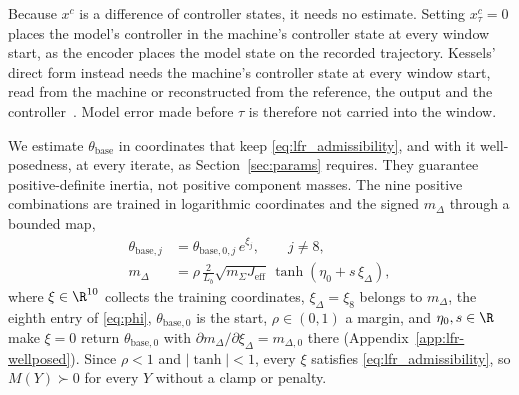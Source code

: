 Because $x^{c}$ is a difference of controller states, it needs no estimate.
Setting $x^{c}_\tau=0$ places the model's controller in the machine's
controller state at every window start, as the encoder places the model state
on the recorded trajectory.
Kessels' direct form instead needs the machine's controller state at every
window start, read from the machine or reconstructed from the reference, the
output and the controller~\cite[Remark~5.4]{kessels2025ai}.
Model error made before $\tau$ is therefore not carried into the window.

We estimate $\theta_{\mathrm{base}}$ in coordinates that keep
\eqref{eq:lfr_admissibility}, and with it well-posedness, at every iterate, as
Section~\ref{sec:params} requires.
They guarantee positive-definite inertia, not positive component masses.
The nine positive combinations are trained in logarithmic coordinates and the
signed $m_\Delta$ through a bounded map,
\begin{equation}
\begin{aligned}
 \theta_{\mathrm{base},j}&=\theta_{\mathrm{base},0,j}\,e^{\xi_j},
 \qquad j\neq8,\\
 m_\Delta&=\rho\,\frac{2}{L_b}\sqrt{m_\Sigma J_{\mathrm{eff}}}\,
   \tanh(\eta_0+s\,\xi_\Delta),
\end{aligned}
\label{eq:mdelta_map}
\end{equation}
where $\xi\in\R^{10}$ collects the training coordinates,
$\xi_\Delta=\xi_8$ belongs to $m_\Delta$, the eighth entry of \eqref{eq:phi},
$\theta_{\mathrm{base},0}$ is the start, $\rho\in(0,1)$ a margin, and
$\eta_0,s\in\R$ make $\xi=0$ return $\theta_{\mathrm{base},0}$ with
$\partial m_\Delta/\partial\xi_\Delta=m_{\Delta,0}$ there
(Appendix~\ref{app:lfr-wellposed}).
Since $\rho<1$ and $|\tanh|<1$, every $\xi$ satisfies
\eqref{eq:lfr_admissibility}, so $M(Y)\succ0$ for every $Y$ without a clamp
or penalty.

